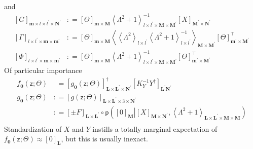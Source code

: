 \documentclass[preprint,12pt]{elsarticle}
\newcommand*{\M}[1]{\ensuremath{#1}\xspace}
\newcommand*{\x}{\times}
\newcommand*{\mi}[1]{\mathbf{#1}}
\newcommand*{\rv}[1]{\mathsf{#1}}
\newcommand*{\te}[2][]{\left\lbrack{#2}\right\rbrack_{#1}}
\newcommand*{\diag}[2][]{\left\langle{#2}\right\rangle_{#1}}
\newcommand*{\prob}[3]{\M{\mathsf{p}\!\left(\left.{#1}\right\vert{#2,#3}\right)}}
\newcommand*{\deq}{\M{\mathrel{\mathop:}=}}
\begin{document}
        and
        \begin{equation*}
            \begin{aligned}
                \te[\mi{m}\x l\x l^{\prime}\x\mi{N^{\prime}}]{G} &\deq 
                \te[\mi{m}\x\mi{M}]{\Theta} \diag[l\x l^{\prime}\x\mi{M}\x\mi{M^{\prime}}]{\Lambda^{2}+1}^{-1} \te[\mi{M^{\prime}}\x\mi{N^{\prime}}]{X}
                    \\
                \te[l\x l^{\prime}\x\mi{m}\x\mi{m}^{\prime}]{\Gamma} &\deq 
                \te[\mi{m}\x\mi{M}]{\Theta} 
                \diag[\mi{M}\x\mi{M^{\prime}}]
                {\diag[l\x l^{\prime}]{\Lambda^{2}} 
                \diag[l\x l^{\prime}]{\Lambda^{2}+1}^{-1}} 
                \te[\mi{m}^{\prime}\x\mi{M^{\prime}}]{\Theta}^{\intercal} \\
                \te[l\x l^{\prime}\x\mi{m}\x\mi{m^{\prime}}]{\Phi} &\deq \te[\mi{m}\x\mi{M}]{\Theta}
                \diag[l\x l^{\prime}\x\mi{M}\x\mi{M^{\prime}}]{\Lambda^{2}+1}^{-1} \te[\mi{m^{\prime}}\x\mi{M^{\prime}}]{\Theta}^{\intercal}
            \end{aligned}
        \end{equation*}
        Of particular importance
        \begin{equation*}
            \begin{aligned}
                f_{\mi{0}}({\rv{z}}; \Theta)
                &\phantom{:}= \te[\mi{L}\x\mi{L^{\prime}}\x\mi{N^{\prime}}]{g_{\mi{0}}({\rv{z}}; \Theta)}^{\dagger}
                \te[\mi{L^{\prime}N^{\prime}}]{K_{Y}^{-1} Y^{\dagger}} \\
                g_{\mi{0}}({\rv{z}}; \Theta) 
                &\deq
                \te[\mi{L}\x\mi{L^{\prime}}\x 3 \x\mi{N^{\prime}}]{g({\rv{z}}; \Theta)} \\
                &\deq
                \te[\mi{L}\x\mi{L^{\prime}}]{\pm F} \circ 
                \prob{\te[\mi{M}]{0}}{\te[\mi{M}\x\mi{N^{\prime}}]{X}}
                {\diag[\mi{L}\x\mi{L^{\prime}}\x\mi{M}\x\mi{M}]{\Lambda^{2}+1}} \\
            \end{aligned}                    
        \end{equation*}
        Standardization of $X$ and $Y$ instills a totally marginal expectation of $f_{\mi{0}}({\rv{z}}; \Theta) \approx \te[\mi{L}]{0}$, but this is usually inexact.
\end{document}
